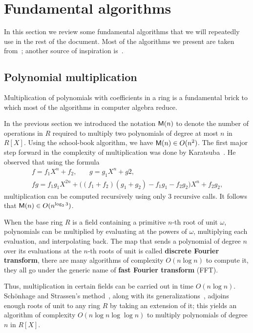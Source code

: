 \section{Fundamental algorithms}
\label{sec:fund-algor}
In this section we review some fundamental algorithms that we will
repeatedly use in the rest of the document. Most of the algorithms we
present are taken from~\cite{vzGG}; another source of inspiration
is~\cite{poly-formel}.

\subsection{Polynomial multiplication}
\label{sec:polyn-mult}
Multiplication of polynomials with coefficients in a ring is a
fundamental brick to which most of the algorithms in computer algebra
reduce.

In the previous section we introduced the notation $\mathsf{M}(n)$ to
denote the number of operations in $R$ required to multiply two
polynomials of degree at most $n$ in $R[X]$.  Using the school-book
algorithm, we have $\mathsf{M}(n) \in O(n^2)$. The first major step forward
in the complexity of multiplication was done by Karatsuba~\cite{karatsuba}. He observed that using
the formula
\begin{gather*}
  f = f_1X^n + f_2\text{,}\qquad g = g_1X^n + g2\text{,}\\
  fg = f_1g_1X^{2n} + \bigl((f_1+f_2)(g_1+g_2)-f_1g_1-f_2g_2\bigr)X^n + f_2g_2
  \text{,}
\end{gather*}
multiplication can be computed recursively using only $3$ recursive
calls.  It follows that $\mathsf{M}(n)\in O(n^{\log_23})$.

When the base ring $R$ is a field containing a primitive $n$-th root
of unit $\omega$, polynomials can be multiplied by evaluating at the
powers of $\omega$, multiplying each evaluation, and interpolating
back. The map that sends a polynomial of degree $n$ over its
evaluations at the $n$-th roots of unit is called
\textbf{discrete Fourier transform},
there are many algorithms of complexity $O(n\log n)$ to compute it,
they all go under the generic name of
\textbf{fast Fourier transform}
(FFT).

Thus, multiplication in certain fields can be carried out in time
$O(n\log n)$. Schönhage and Strassen's
method~\cite{schonage+strassen}, along with its
generalizations~\cite{schonhage77,cantor+kaltofen91}, adjoins enough
roots of unit to any ring $R$ by taking an extension of it; this
yields an algorithm of complexity $O(n\log n\log\log n)$ to multiply
polynomials of degree $n$ in $R[X]$.

